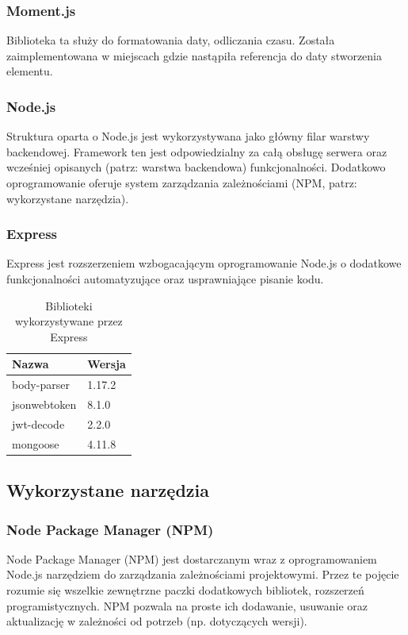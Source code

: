 \documentclass[eng,printmode]{mgr}
\begin{document}
\subsubsection{Moment.js}
Biblioteka ta \cite{MomentJS} służy do formatowania daty, odliczania czasu. Została zaimplementowana w miejscach gdzie nastąpiła referencja do daty stworzenia elementu.

\subsubsection{Node.js}
Struktura oparta o Node.js \cite{NodeJS} jest wykorzystywana jako główny filar warstwy backendowej. Framework ten jest odpowiedzialny za całą obsługę serwera oraz wcześniej opisanych (patrz: warstwa backendowa) funkcjonalności. Dodatkowo oprogramowanie oferuje system zarządzania zależnościami (NPM, patrz: wykorzystane narzędzia).

\subsubsection{Express}
Express \cite{Express} jest rozszerzeniem wzbogacającym oprogramowanie Node.js o dodatkowe funkcjonalności automatyzujące oraz usprawniające pisanie kodu.

\begin{table}[H]
\begin{tabularx}{\textwidth}{|X|X|}
   \hline
    \textbf{Nazwa} & \textbf{Wersja} \\
   \hline
     body-parser & 1.17.2 \\
   \hline
     jsonwebtoken & 8.1.0 \\
   \hline
  	 jwt-decode & 2.2.0 \\
   \hline
   	 mongoose & 4.11.8 \\
   \hline
\end{tabularx}
\caption{Biblioteki wykorzystywane przez Express}
\end{table}

\subsection{Wykorzystane narzędzia}

\subsubsection{Node Package Manager (NPM)}
Node Package Manager (NPM) \cite{NPM} jest dostarczanym wraz z oprogramowaniem Node.js narzędziem do zarządzania zależnościami projektowymi. Przez te pojęcie rozumie się wszelkie zewnętrzne paczki dodatkowych bibliotek, rozszerzeń programistycznych. NPM pozwala na proste ich dodawanie, usuwanie oraz aktualizację w zależności od potrzeb (np. dotyczących wersji).
\end{document}
